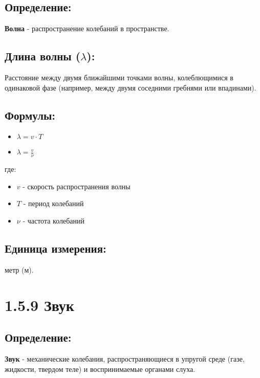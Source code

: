 \documentclass[a4paper,12pt]{article}
\begin{document}
\vspace{-9pt}
\subsection*{Определение:}
\vspace{-3pt}
\textbf{Волна} - распространение колебаний в пространстве.

\vspace{-9pt}
\subsection*{Длина волны ($\lambda$):}
\vspace{-3pt}
Расстояние между двумя ближайшими точками волны, колеблющимися в одинаковой фазе (например, между двумя соседними гребнями или впадинами).

\vspace{-9pt}
\subsection*{Формулы:}
\vspace{-3pt}
\begin{itemize}[itemsep=0pt, topsep=0pt, parsep=0pt]
    \item $\lambda = v \cdot T$
    \item $\lambda = \frac{v}{\nu}$
\end{itemize}
где:
\begin{itemize}
    \item $v$ - скорость распространения волны
    \item $T$ - период колебаний
    \item $\nu$ - частота колебаний
\end{itemize}

\vspace{-9pt}
\subsection*{Единица измерения:}
\vspace{-3pt}
метр (м).

\newpage
\section*{1.5.9 Звук}

\vspace{-9pt}
\subsection*{Определение:}
\vspace{-3pt}
\textbf{Звук} - механические колебания, распространяющиеся в упругой среде (газе, жидкости, твердом теле) и воспринимаемые органами слуха.
\end{document}
